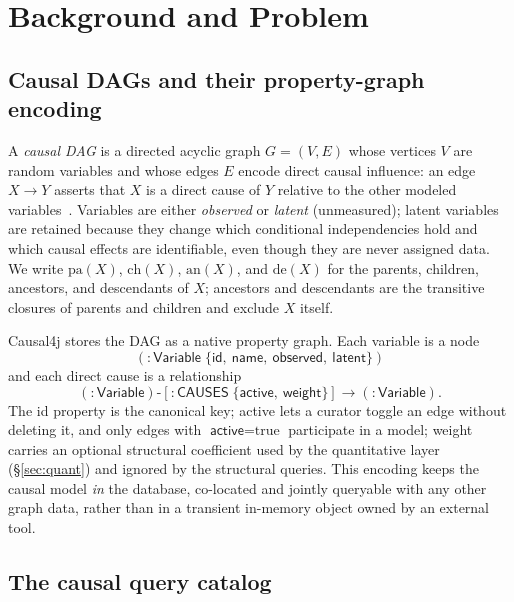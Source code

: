 \section{Background and Problem}\label{sec:bg}

\subsection{Causal DAGs and their property-graph encoding}\label{sec:bg:dag}

A \emph{causal DAG} is a directed acyclic graph $G=(V,E)$ whose vertices $V$ are
random variables and whose edges $E$ encode direct causal influence: an edge
$X\!\rightarrow\!Y$ asserts that $X$ is a direct cause of $Y$ relative to the
other modeled variables~\cite{pearl2009causality}. Variables are either
\emph{observed} or \emph{latent} (unmeasured); latent variables are retained
because they change which conditional independencies hold and which causal
effects are identifiable, even though they are never assigned data. We write
$\mathrm{pa}(X)$, $\mathrm{ch}(X)$, $\mathrm{an}(X)$, and $\mathrm{de}(X)$ for
the parents, children, ancestors, and descendants of $X$; ancestors and
descendants are the transitive closures of parents and children and exclude $X$
itself.

Causal4j stores the DAG as a native property graph. Each variable is a node
\[
  (:\textsf{Variable}\;\{\textsf{id},\ \textsf{name},\ \textsf{observed},\ \textsf{latent}\})
\]
and each direct cause is a relationship
\[
  (:\textsf{Variable})\text{-}[:\textsf{CAUSES}\;\{\textsf{active},\ \textsf{weight}\}]\!\rightarrow\!(:\textsf{Variable}).
\]
The \textsf{id} property is the canonical key; \textsf{active} lets a curator
toggle an edge without deleting it, and only edges with $\textsf{active}=\text{true}$
participate in a model; \textsf{weight} carries an optional structural
coefficient used by the quantitative layer (\S\ref{sec:quant}) and ignored by the
structural queries. This encoding keeps the causal model \emph{in} the database,
co-located and jointly queryable with any other graph data, rather than in a
transient in-memory object owned by an external tool.

\subsection{The causal query catalog}\label{sec:bg:catalog}

